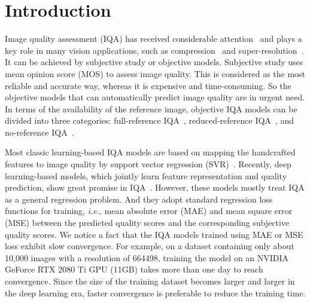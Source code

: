 \documentclass[sigconf]{acmart}
\begin{document}

\maketitle

\section{Introduction}
\label{sec:introduction}

Image quality assessment (IQA) has received considerable attention~\cite{wang2004image,mittal2012no,ye2012unsupervised,kang2014convolutional,ma2016group,hosu2019koniq} and plays a key role in many vision applications, such as compression~\cite{rippel2019learned} and super-resolution~\cite{zhang2019ranksrgan}.
It can be achieved by subjective study or objective models. 
Subjective study uses mean opinion score (MOS) to assess image quality.
This is considered as the most reliable and accurate way, whereas it is expensive and time-consuming.
So the objective models that can automatically predict image quality are in urgent need.
In terms of the availability of the reference image, objective IQA models can be divided into three categories: full-reference IQA~\cite{wang2004image,zhang2014vsi,kim2017deep0,bosse2018deep}, reduced-reference IQA~\cite{ma2011reduced,xu2015fractal,bampis2017speed,liu2018reduced}, and no-reference IQA~\cite{mittal2012no,kang2014convolutional,liu2017rankiqa,ren2018ran4iqa}.

Most classic learning-based IQA models are based on mapping the handcrafted features to image quality by support vector regression (SVR)~\cite{mittal2012no}.
Recently, deep learning-based models, which jointly learn feature representation and quality prediction, show great promise in IQA~\cite{kang2014convolutional,ren2018ran4iqa,lin2018hallucinated,hosu2019koniq}.
However, these models mostly treat IQA as a general regression problem.
And they adopt standard regression loss functions for training, \textit{i.e.}, mean absolute error (MAE) and mean square error (MSE) between the predicted quality scores and the corresponding subjective quality scores.
We notice a fact that the IQA models trained using MAE or MSE loss exhibit slow convergence. 
For example, on a dataset containing only about 10,000 images with a resolution of 664498, training the model on an NVIDIA GeForce RTX 2080 Ti GPU (11GB) takes more than one day to reach convergence.
Since the size of the training dataset becomes larger and larger in the deep learning era, faster convergence is preferable to reduce the training time.
\end{document}
